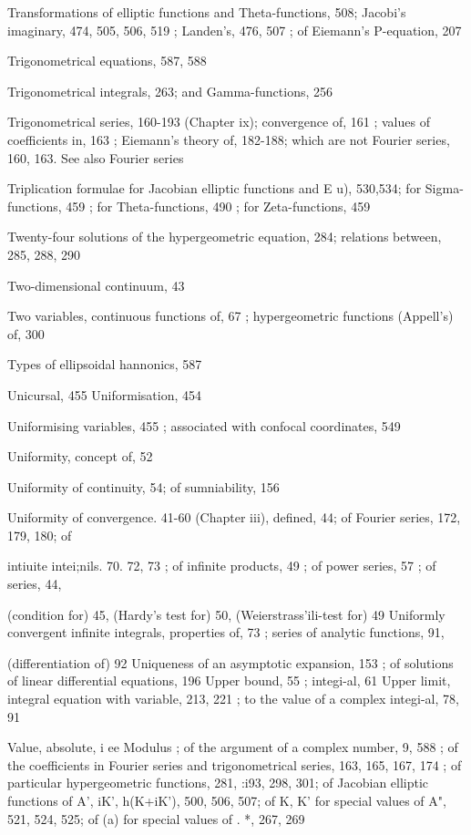Transformations of elliptic functions and Theta-functions, 508; Jacobi's imaginary, 474, 505,
506, 519 ; Landen's, 476, 507 ; of Eiemann's P-equation, 207

Trigonometrical equations, 587, 588

Trigonometrical integrals, 263; and Gamma-functions, 256

Trigonometrical series, 160-193 (Chapter ix); convergence of, 161 ; values of coefficients in, 163 ;
Eiemann's theory of, 182-188; which are not Fourier series, 160, 163. See also Fourier series

Triplication formulae for Jacobian elliptic functions and E  u), 530,534; for Sigma-functions,
459 ; for Theta-functions, 490 ; for Zeta-functions, 459

Twenty-four solutions of the hypergeometric equation, 284; relations between, 285, 288, 290

Two-dimensional continuum, 43

Two variables, continuous functions of, 67 ; hypergeometric functions (Appell's) of, 300

Types of ellipsoidal hannonics, 587

Unicursal, 455
Uniformisation, 454


%
%

Uniformising variables, 455 ; associated with confocal coordinates, 549

Uniformity, concept of, 52

Uniformity of continuity, 54; of sumniability, 156

Uniformity of convergence. 41-60 (Chapter iii), defined, 44; of Fourier series, 172, 179, 180; of

intiuite intei;nils. 70. 72, 73 ; of infinite products, 49 ; of power series, 57 ; of series, 44,

(condition for) 45, (Hardy's test for) 50, (Weierstrass'ili-test for) 49
Uniformly convergent infinite integrals, properties of, 73 ; series of analytic functions, 91,

(differentiation of) 92
Uniqueness of an asymptotic expansion, 153 ; of solutions of linear differential equations, 196
Upper bound, 55 ; integi-al, 61
Upper limit, integral equation with variable, 213, 221 ; to the value of a complex integi-al, 78, 91

Value, absolute, i ee Modulus ; of the argument of a complex number, 9, 588 ; of the coefficients
in Fourier series and trigonometrical series, 163, 165, 167, 174 ; of particular hypergeometric
functions, 281, :i93, 298, 301; of Jacobian elliptic functions of  A',  iK', h(K+iK'), 500,
506, 507; of K, K' for special values of A", 521, 524, 525; of  (a) for special values of . *,
267, 269


